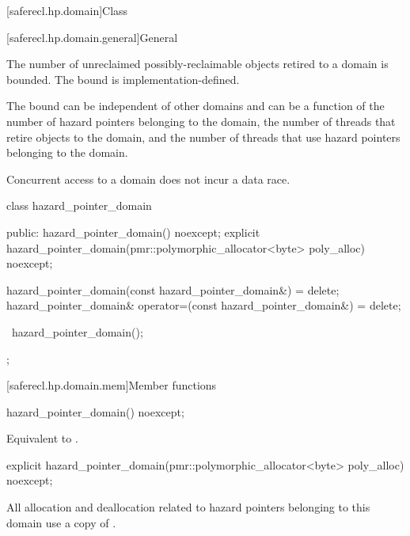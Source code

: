 [saferecl.hp.domain]{Class }

[saferecl.hp.domain.general]{General}

The number of unreclaimed possibly-reclaimable objects retired to a domain is bounded.
The bound is implementation-defined. \begin{note} The bound can be independent of other
domains and can be a function of the number of hazard pointers belonging to the
domain, the number of threads that retire objects to the domain, and the number of
threads that use hazard pointers belonging to the domain.\end{note}

Concurrent access to a domain does not incur a data race. %

\begin{codeblock}
class hazard_pointer_domain {
public:
  hazard_pointer_domain() noexcept;
  explicit hazard_pointer_domain(pmr::polymorphic_allocator<byte> poly_alloc) noexcept;

  hazard_pointer_domain(const hazard_pointer_domain&) = delete;
  hazard_pointer_domain& operator=(const hazard_pointer_domain&) = delete;

  ~hazard_pointer_domain();
};
\end{codeblock}

[saferecl.hp.domain.mem]{Member functions}

\begin{itemdecl}
hazard_pointer_domain() noexcept;
\end{itemdecl}

\begin{itemdescr}

\effects 
Equivalent to .

\end{itemdescr}

\begin{itemdecl}
explicit hazard_pointer_domain(pmr::polymorphic_allocator<byte> poly_alloc) noexcept;
\end{itemdecl}

\begin{itemdescr}

\remarks 
All allocation and deallocation related to hazard pointers belonging to this
domain use a copy of .

\end{itemdescr}

